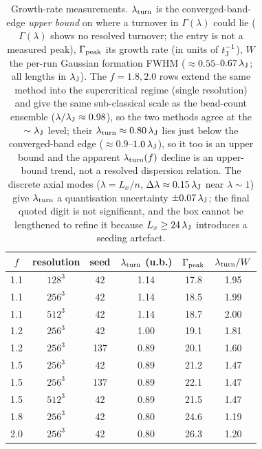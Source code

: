 \documentclass[usenatbib,twoside,twocolumn]{mnras}
\begin{document}
\begin{table}
\caption{Growth-rate measurements. $\lambda_{\rm turn}$ is the converged-band-edge \emph{upper bound} on where a turnover in $\Gamma(\lambda)$ could lie ($\Gamma(\lambda)$ shows no resolved turnover; the entry is not a measured peak), $\Gamma_{\rm peak}$ its growth rate (in units of $t_{\rm J}^{-1}$), $W$ the per-run Gaussian formation FWHM ($\approx0.55$--$0.67\,\lambda_{\rm J}$; all lengths in $\lambda_{\rm J}$). The $f=1.8,2.0$ rows extend the same method into the supercritical regime (single resolution) and give the same sub-classical scale as the bead-count ensemble ($\lambda/\lambda_{\rm J}\approx0.98$), so the two methods agree at the $\sim\lambda_{\rm J}$ level; their $\lambda_{\rm turn}\approx0.80\,\lambda_{\rm J}$ lies just below the converged-band edge ($\approx0.9$--$1.0\,\lambda_{\rm J}$), so it too is an upper bound and the apparent $\lambda_{\rm turn}(f)$ decline is an upper-bound trend, not a resolved dispersion relation. The discrete axial modes ($\lambda=L_x/n$, $\Delta\lambda\approx0.15\,\lambda_{\rm J}$ near $\lambda\sim1$) give $\lambda_{\rm turn}$ a quantisation uncertainty $\pm0.07\,\lambda_{\rm J}$; the final quoted digit is not significant, and the box cannot be lengthened to refine it because $L_x\geq24\,\lambda_{\rm J}$ introduces a seeding artefact.}
\label{tab:wave}
\footnotesize
\setlength{\tabcolsep}{4pt}
\begin{tabular}{cccccc}
\toprule
$f$ & resolution & seed & $\lambda_{\rm turn}$ (u.b.) & $\Gamma_{\rm peak}$ & $\lambda_{\rm turn}/W$ \\
\midrule
1.1 & $128^3$ & 42  & 1.14 & 17.8 & 1.95 \\
1.1 & $256^3$ & 42  & 1.14 & 18.5 & 1.99 \\
1.1 & $512^3$ & 42  & 1.14 & 18.7 & 2.00 \\
1.2 & $256^3$ & 42  & 1.00 & 19.1 & 1.81 \\
1.2 & $256^3$ & 137 & 0.89 & 20.1 & 1.60 \\
1.5 & $256^3$ & 42  & 0.89 & 21.2 & 1.47 \\
1.5 & $256^3$ & 137 & 0.89 & 22.1 & 1.47 \\
1.5 & $512^3$ & 42  & 0.89 & 21.5 & 1.47 \\
1.8 & $256^3$ & 42  & 0.80 & 24.6 & 1.19 \\
2.0 & $256^3$ & 42  & 0.80 & 26.3 & 1.20 \\
\bottomrule
\end{tabular}
\end{table}
\end{document}
